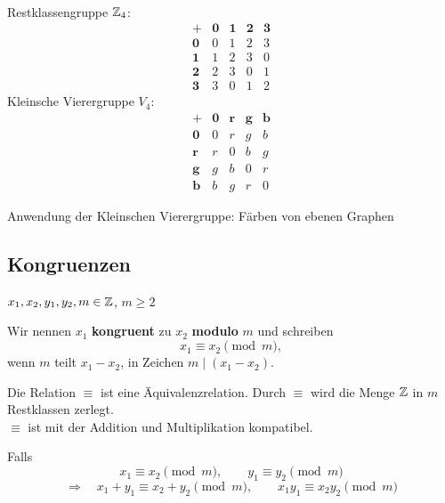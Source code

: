 \begin{beispiel}\ \\[1ex]
Restklassengruppe $\mathbb{Z}_{4}$:
\[
\begin{array}{c|cccc}
+ & \mathbf{0} & \mathbf{1} & \mathbf{2} & \mathbf{3} \\ \hline
\mathbf{0} & 0 & 1 & 2 & 3 \\
\mathbf{1} & 1 & 2 & 3 & 0 \\
\mathbf{2} & 2 & 3 & 0 & 1 \\
\mathbf{3} & 3 & 0 & 1 & 2
\end{array}
\]
Kleinsche Vierergruppe $V_4$:
\[
\begin{array}{c|cccc}
+ & \mathbf{0} & \boldsymbol{r} & \boldsymbol{g} & \boldsymbol{b} \\ \hline
\mathbf{0} & 0 & r & g & b \\
\boldsymbol{r} & r & 0 & b & g \\
\boldsymbol{g} & g & b & 0 & r \\
\boldsymbol{b} & b & g & r & 0
\end{array}
\]
\end{beispiel}

Anwendung der Kleinschen Vierergruppe: Färben von ebenen Graphen

\subsection{Kongruenzen}

$x_1, x_2, y_1, y_2, m \in \mathbb{Z}$, $m \geq 2$

\begin{definition}
Wir nennen $x_1$ \textbf{kongruent} zu $x_2$ \textbf{modulo} $m$ und schreiben
\[ x_1 \equiv x_2 \pmod{m}, \]
wenn $m$ teilt $x_1 - x_2$, in Zeichen $m \mid (x_1 - x_2)$.
\end{definition}

Die Relation $\equiv$ ist eine Äquivalenzrelation. Durch $\equiv$ wird die Menge $\mathbb{Z}$ in $m$ Restklassen zerlegt.\\
$\equiv$ ist mit der Addition und Multiplikation kompatibel.

\begin{satz}
Falls
\[ x_1 \equiv x_2 \pmod{m}, \qquad y_1 \equiv y_2 \pmod{m} \]
\[ \Rightarrow \quad x_1 + y_1 \equiv x_2 + y_2 \pmod{m}, \qquad x_1 y_1 \equiv x_2 y_2 \pmod{m} \]
\end{satz}

